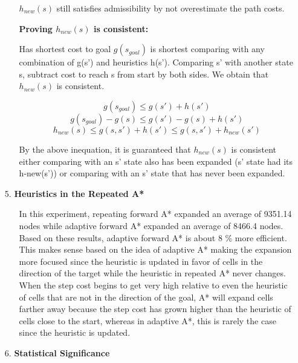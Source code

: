 \documentclass{article}
\begin{document}
\begin{enumerate}
\begin{enumerate}
            $h_{new}(s)$ still satisfies admissibility by not overestimate the path costs.

            \textbf{Proving $h_{new}(s)$ is consistent:} \par
            Has shortest cost to goal $g(s_{goal})$ is shortest comparing with any combination of g(s') and heuristics h(s'). Comparing s' with another state s, subtract cost to reach s from start by both sides. We obtain that $h_{new}(s)$ is consistent.
            
            \[g(s_{goal}) \leq g(s') + h(s') \] 
            \[g(s_{goal}) - g(s) \leq g(s') - g(s) + h(s') \] 
            \[h_{new}(s) \leq g(s,s') + h(s') \leq g(s,s') + h_{new}(s') \]         

            By the above inequation, it is guaranteed that $h_{new}(s)$ is consistent either comparing with an s' state also has been expanded (s' state had its h-new(s')) or comparing with an s' state that has never been expanded.
                
            \end{enumerate}
        \item[5.] \textbf{Heuristics in the Repeated A*}
            \begin{enumerate}
                \item[] In this experiment, repeating forward A* expanded an average of 9351.14 nodes while adaptive forward A* expanded an average of 8466.4 nodes.  Based on these results, adaptive forward A* is about 8 \% more efficient.  This makes sense based on the idea of adaptive A* making the expansion more focused since the heuristic is updated in favor of cells in the direction of the target while the heuristic in repeated A* never changes.  When the step cost begins to get very high relative to even the heuristic of cells that are not in the direction of the goal, A* will expand cells farther away because the step cost has grown higher than the heuristic of cells close to the start, whereas in adaptive A*, this is rarely the case since the heuristic is updated.
            \end{enumerate}
        \item[6.] \textbf{Statistical Significance}
    \end{enumerate}
\end{document}
